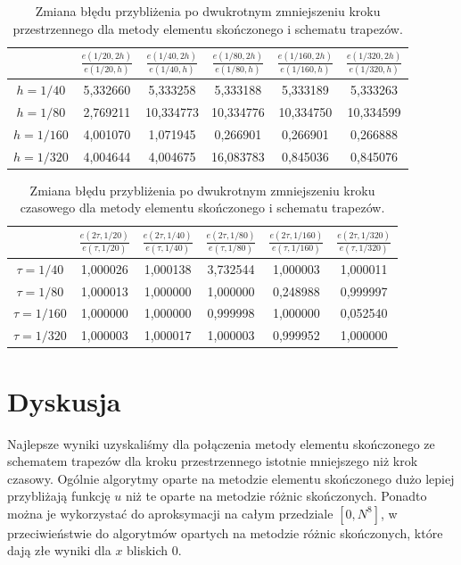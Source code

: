 \documentclass{article}
\begin{document}
\begin{table}[h!]
	\caption{Zmiana błędu przybliżenia po dwukrotnym zmniejszeniu kroku przestrzennego dla metody elementu skończonego i schematu trapezów.}
	\centering
	\begin{tabular}{|c|c|c|c|c|c|}
		\hline
		& $\frac{e(1/20,2h)}{e(1/20,h)}$ &  $\frac{e(1/40,2h)}{e(1/40,h)}$ &  $\frac{e(1/80,2h)}{e(1/80,h)}$ &  $\frac{e(1/160,2h)}{e(1/160,h)}$ &  $\frac{e(1/320,2h)}{e(1/320,h)}$ \\
		\hline
		$h=1/40$  &  5,332660 &	5,333258 &	5,333188 &	5,333189 &	5,333263 \\
		\hline
		$h=1/80$  &2,769211 &	10,334773 &	10,334776 &	10,334750 &	10,334599 \\
		\hline
		$h=1/160$ & 4,001070 &	1,071945 &	0,266901 &	0,266901 &	0,266888 \\
		\hline
		$h=1/320$ & 4,004644 &	4,004675 &	16,083783 &	0,845036 &	0,845076 \\
		\hline
	\end{tabular}
\end{table}
\begin{table}[h!]
	\caption{Zmiana błędu przybliżenia po dwukrotnym zmniejszeniu kroku czasowego dla metody elementu skończonego i schematu trapezów.}
	\centering
	\begin{tabular}{|c|c|c|c|c|c|}
		\hline
		& $\frac{e(2\tau,1/20)}{e(\tau,1/20)}$ &  $\frac{e(2\tau,1/40)}{e(\tau,1/40)}$ &  $\frac{e(2\tau,1/80)}{e(\tau,1/80)}$ &  $\frac{e(2\tau,1/160)}{e(\tau,1/160)}$ &  $\frac{e(2\tau,1/320)}{e(\tau,1/320)}$ \\
		\hline
		$\tau=1/40$ & 1,000026 &	1,000138 &	3,732544 &	1,000003 &	1,000011 \\
		\hline
		$\tau=1/80$  & 1,000013 &	1,000000 &	1,000000 &	0,248988 &	0,999997 \\
		\hline
		$\tau=1/160$ & 1,000000 &	1,000000 &	0,999998 &	1,000000 &	0,052540 \\
		\hline
		$\tau=1/320$ & 1,000003 &	1,000017 &	1,000003 &	0,999952 &	1,000000 \\
		\hline
	\end{tabular}
\end{table}

\newpage
\section{Dyskusja}
Najlepsze wyniki uzyskaliśmy dla połączenia metody elementu skończonego ze schematem trapezów dla kroku przestrzennego istotnie mniejszego niż krok czasowy. Ogólnie algorytmy oparte na metodzie elementu skończonego dużo lepiej przybliżają funkcję $u$ niż te oparte na metodzie różnic skończonych. Ponadto można je wykorzystać do aproksymacji na całym przedziale $[0, N^{8}]$, w przeciwieństwie do algorytmów opartych na metodzie różnic skończonych, które dają złe wyniki dla $x$ bliskich 0.
 
\end{document}

